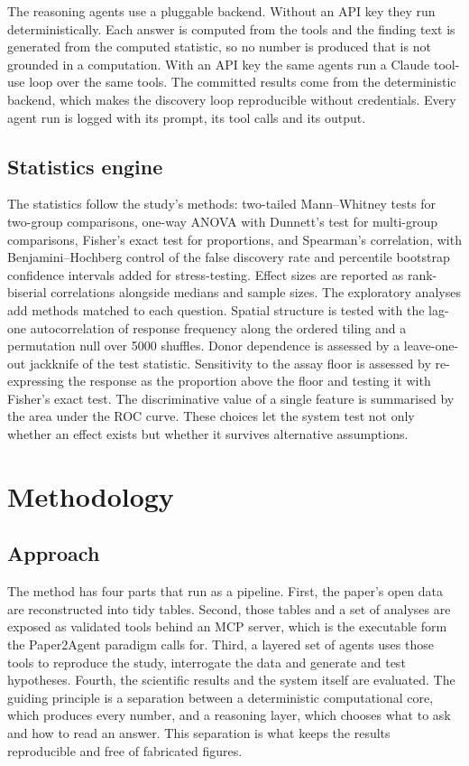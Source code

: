 \documentclass[11pt]{article}
\begin{document}
The reasoning agents use a pluggable backend. Without an API key they run deterministically. Each answer is computed from the tools and the finding text is generated from the computed statistic,
so no number is produced that is not grounded in a computation. With an API key the same agents
run a Claude tool-use loop over the same tools. The committed results come from the deterministic
backend, which makes the discovery loop reproducible without credentials. Every agent run is logged
with its prompt, its tool calls and its output.

\subsection{Statistics engine}
The statistics follow the study's methods: two-tailed Mann--Whitney tests for two-group
comparisons, one-way ANOVA with Dunnett's test for multi-group comparisons, Fisher's exact test
for proportions, and Spearman's correlation, with Benjamini--Hochberg control of the false
discovery rate and percentile bootstrap confidence intervals added for stress-testing. Effect
sizes are reported as rank-biserial correlations alongside medians and sample sizes. The
exploratory analyses add methods matched to each question. Spatial structure is tested with the
lag-one autocorrelation of response frequency along the ordered tiling and a permutation null over
5000 shuffles. Donor dependence is assessed by a leave-one-out jackknife of the test statistic.
Sensitivity to the assay floor is assessed by re-expressing the response as the proportion above the
floor and testing it with Fisher's exact test. The discriminative value of a single feature is
summarised by the area under the ROC curve. These choices let the system test not only whether an
effect exists but whether it survives alternative assumptions.

\section{Methodology}
\subsection{Approach}
The method has four parts that run as a pipeline. First, the paper's open data are reconstructed into
tidy tables. Second, those tables and a set of analyses are exposed as validated tools behind an MCP
server, which is the executable form the Paper2Agent paradigm calls for. Third, a layered set of
agents uses those tools to reproduce the study, interrogate the data and generate and test
hypotheses. Fourth, the scientific results and the system itself are evaluated. The guiding principle
is a separation between a deterministic computational core, which produces every number, and a
reasoning layer, which chooses what to ask and how to read an answer. This separation is what keeps
the results reproducible and free of fabricated figures.
\end{document}
